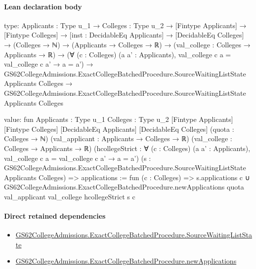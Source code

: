 \documentclass[10pt]{article}
\begin{document}
\paragraph{Lean declaration body}
\begin{ReviewVerbatim}
type:
{Applicants : Type u_1} →
  {Colleges : Type u_2} →
    [Fintype Applicants] →
      [Fintype Colleges] →
        [inst : DecidableEq Applicants] →
          [DecidableEq Colleges] →
            (Colleges → ℕ) →
              (Applicants → Colleges → ℝ) →
                (val_college : Colleges → Applicants → ℝ) →
                  (∀ (c : Colleges) (a a' : Applicants), val_college c a = val_college c a' → a = a') →
                    GS62CollegeAdmissions.ExactCollegeBatchedProcedure.SourceWaitingListState Applicants Colleges →
                      GS62CollegeAdmissions.ExactCollegeBatchedProcedure.SourceWaitingListState Applicants Colleges

value:
fun {Applicants : Type u_1} {Colleges : Type u_2} [Fintype Applicants] [Fintype Colleges] [DecidableEq Applicants]
    [DecidableEq Colleges] (quota : Colleges → ℕ) (val_applicant : Applicants → Colleges → ℝ)
    (val_college : Colleges → Applicants → ℝ)
    (hcollegeStrict : ∀ (c : Colleges) (a a' : Applicants), val_college c a = val_college c a' → a = a')
    (s : GS62CollegeAdmissions.ExactCollegeBatchedProcedure.SourceWaitingListState Applicants Colleges) =>
  {
    applications := fun (c : Colleges) =>
      s.applications c ∪
        GS62CollegeAdmissions.ExactCollegeBatchedProcedure.newApplications quota val_applicant val_college
          hcollegeStrict s c }
\end{ReviewVerbatim}

\paragraph{Direct retained dependencies}
\begin{itemize}\raggedright
\item \hyperlink{governing-declaration-2a222855a7d234b6}{GS62\allowbreak{}College\allowbreak{}Admissions.\allowbreak{}Exact\allowbreak{}College\allowbreak{}Batched\allowbreak{}Procedure.\allowbreak{}Source\allowbreak{}Waiting\allowbreak{}List\allowbreak{}State}
\item \hyperlink{governing-declaration-af45c64e4d2fd2f5}{GS62\allowbreak{}College\allowbreak{}Admissions.\allowbreak{}Exact\allowbreak{}College\allowbreak{}Batched\allowbreak{}Procedure.\allowbreak{}new\allowbreak{}Applications}
\end{itemize}
\hypertarget{governing-declaration-5f295db79d7f234f}{}
\end{document}
